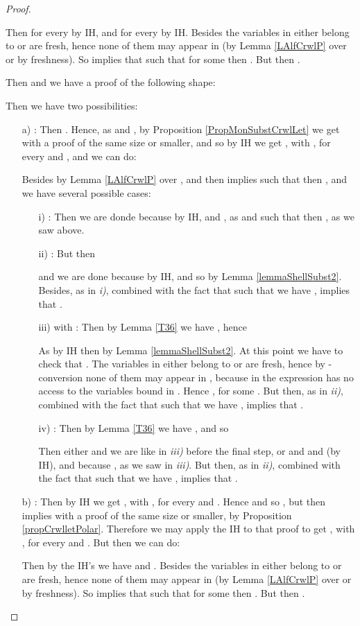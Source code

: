 \begin{proof}
\begin{description}
  Then  for every  by IH,  and  for every  by IH.
Besides the variables in  either belong to  or are fresh, hence none of them may appear in  (by Lemma \ref{LAlfCrwlP} over  or by freshness).
So
   implies that  such
  that  for some  then
  . But then
  .

\item[\clrule{Let}] Then  and we have a proof of the following shape:

Then we have two possibilities:
\begin{enumerate}
 \item[a)] : Then . Hence, as  and , by Proposition \ref{PropMonSubstCrwlLet} we get  with a proof of the same size or smaller, and so by IH we get , with ,  for every  and , and we can do:

Besides  by Lemma \ref{LAlfCrwlP} over , and then  implies  such that  then , and we have several possible cases:
\begin{enumerate}
  \item[i)] : Then we are donde because  by IH,  and , as  and  such that  then , as we saw above.

  \item[ii)] : But then

and we are done because  by IH, and so  by Lemma \ref{lemmaShellSubst2}. Besides, as in {\it i)},  combined with the fact that  such that  we have , implies that .

  \item[iii)]  with : Then by Lemma \ref{T36} we have  , hence

As by IH  then  by Lemma \ref{lemmaShellSubst2}. At this point we have to check that    .
The variables in  either belong to  or are fresh, hence by -conversion none of them may appear in , because in  the expression  has no access to the variables bound in  . Hence , for some .
But then, as in {\it ii)},  combined with the fact that  such that  we have , implies that .
\item[iv)] : Then by Lemma \ref{T36} we have , and so

Then either  and we are like in {\it iii)} before the final  step, or  and  and  (by IH), and  because , as we saw in {\it iii)}. But then, as in {\it ii)},  combined with the fact that  such that  we have , implies that .
\end{enumerate}
 \item[b)] : Then by IH we get , with ,  for every  and . Hence  and so , but then  implies  with a proof of the same size or smaller, by Proposition \ref{propCrwlletPolar}. Therefore we may apply the IH to that proof to get , with ,  for every  and . But then we can do:

Then by the IH's we have  and . Besides the variables in  either belong to  or are fresh, hence none of them may appear in  (by Lemma \ref{LAlfCrwlP} over  or by freshness). So   implies that  such that  for some  then . But then .
\end{enumerate}
\end{description}
\end{proof}

